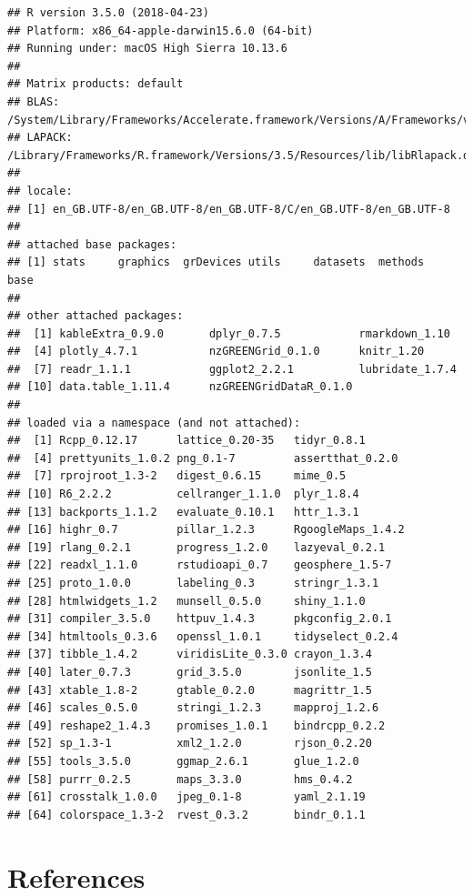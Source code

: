 \documentclass[]{article}
\begin{document}
\begin{verbatim}
## R version 3.5.0 (2018-04-23)
## Platform: x86_64-apple-darwin15.6.0 (64-bit)
## Running under: macOS High Sierra 10.13.6
## 
## Matrix products: default
## BLAS: /System/Library/Frameworks/Accelerate.framework/Versions/A/Frameworks/vecLib.framework/Versions/A/libBLAS.dylib
## LAPACK: /Library/Frameworks/R.framework/Versions/3.5/Resources/lib/libRlapack.dylib
## 
## locale:
## [1] en_GB.UTF-8/en_GB.UTF-8/en_GB.UTF-8/C/en_GB.UTF-8/en_GB.UTF-8
## 
## attached base packages:
## [1] stats     graphics  grDevices utils     datasets  methods   base     
## 
## other attached packages:
##  [1] kableExtra_0.9.0       dplyr_0.7.5            rmarkdown_1.10        
##  [4] plotly_4.7.1           nzGREENGrid_0.1.0      knitr_1.20            
##  [7] readr_1.1.1            ggplot2_2.2.1          lubridate_1.7.4       
## [10] data.table_1.11.4      nzGREENGridDataR_0.1.0
## 
## loaded via a namespace (and not attached):
##  [1] Rcpp_0.12.17      lattice_0.20-35   tidyr_0.8.1      
##  [4] prettyunits_1.0.2 png_0.1-7         assertthat_0.2.0 
##  [7] rprojroot_1.3-2   digest_0.6.15     mime_0.5         
## [10] R6_2.2.2          cellranger_1.1.0  plyr_1.8.4       
## [13] backports_1.1.2   evaluate_0.10.1   httr_1.3.1       
## [16] highr_0.7         pillar_1.2.3      RgoogleMaps_1.4.2
## [19] rlang_0.2.1       progress_1.2.0    lazyeval_0.2.1   
## [22] readxl_1.1.0      rstudioapi_0.7    geosphere_1.5-7  
## [25] proto_1.0.0       labeling_0.3      stringr_1.3.1    
## [28] htmlwidgets_1.2   munsell_0.5.0     shiny_1.1.0      
## [31] compiler_3.5.0    httpuv_1.4.3      pkgconfig_2.0.1  
## [34] htmltools_0.3.6   openssl_1.0.1     tidyselect_0.2.4 
## [37] tibble_1.4.2      viridisLite_0.3.0 crayon_1.3.4     
## [40] later_0.7.3       grid_3.5.0        jsonlite_1.5     
## [43] xtable_1.8-2      gtable_0.2.0      magrittr_1.5     
## [46] scales_0.5.0      stringi_1.2.3     mapproj_1.2.6    
## [49] reshape2_1.4.3    promises_1.0.1    bindrcpp_0.2.2   
## [52] sp_1.3-1          xml2_1.2.0        rjson_0.2.20     
## [55] tools_3.5.0       ggmap_2.6.1       glue_1.2.0       
## [58] purrr_0.2.5       maps_3.3.0        hms_0.4.2        
## [61] crosstalk_1.0.0   jpeg_0.1-8        yaml_2.1.19      
## [64] colorspace_1.3-2  rvest_0.3.2       bindr_0.1.1
\end{verbatim}

\section*{References}\label{references}
\end{document}
